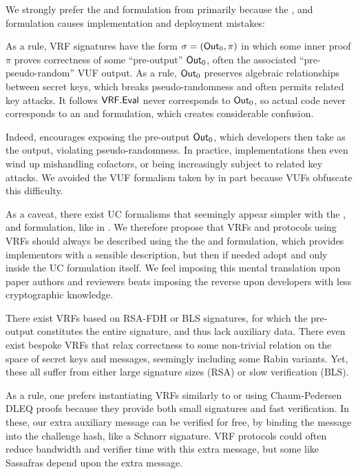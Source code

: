 We strongly prefer the \Sign and \Verify formulation from \cite{agg_dkg}
primarily because the , and 
formulation causes implementation and deployment mistakes:

As a rule, VRF signatures have the form $\sigma = ({\mathsf{Out}}_0,\pi)$ in which
some inner proof $\pi$ proves correctness of some ``pre-output'' ${\mathsf{Out}}_0$,
 often the associated ``pre-pseudo-random'' VUF output.
As a rule, ${\mathsf{Out}}_0$ preserves algebraic relationships between secret keys,
 which breaks pseudo-randomness and often permits related key attacks.
It follows ${\mathsf{VRF}}.{\mathsf{Eval}}$ never corresponds to ${\mathsf{Out}}_0$, so actual code never
corresponds to an  and  formulation,
 which creates considerable confusion.

Indeed,  encourages exposing the pre-output ${\mathsf{Out}}_0$,
which developers then take as the output, violating pseudo-randomness. 
In practice, implementations then even wind up mishandling cofactors,
 or being increasingly subject to related key attacks.
We avoided the VUF formalism taken by \cite{agg_dkg} in part because VUFs obfuscate this difficulty.

As a caveat, there exist UC formalisms that seemingly appear simpler
with the , and  formulation,
like in \cite{praos}.
We therefore propose that VRFs and protocols using VRFs should always be
described using the the \Sign and \Verify formulation, which provides
implementors with a sensible description, but then if needed adopt
  and  only inside the UC formulation itself.
We feel imposing this mental translation upon paper authors and reviewers
 beats imposing the reverse upon developers with less cryptographic knowledge.

\smallskip

There exist VRFs based on RSA-FDH or BLS signatures, for which the
pre-output constitutes the entire signature, and thus lack auxiliary data. 
There even exist bespoke VRFs that relax correctness to some non-trivial
relation on the space of secret keys and messages,
 seemingly including some Rabin variants. 
Yet, these all suffer from either large signature sizes (RSA) or
 slow verification (BLS).

As a rule, one prefers instantiating VRFs similarly to
 \cite{nsec5} or \cite{VXEd25519} using Chaum-Pedersen DLEQ proofs \cite{CP93}
 because they provide both small signatures and fast verification.
In these, our extra auxiliary message \aux can be verified for free,
by binding the message into the challenge hash, like a Schnorr signature.
VRF protocols could often reduce bandwidth and verifier time with
this extra message, but some like Sassafras depend upon the extra message.



